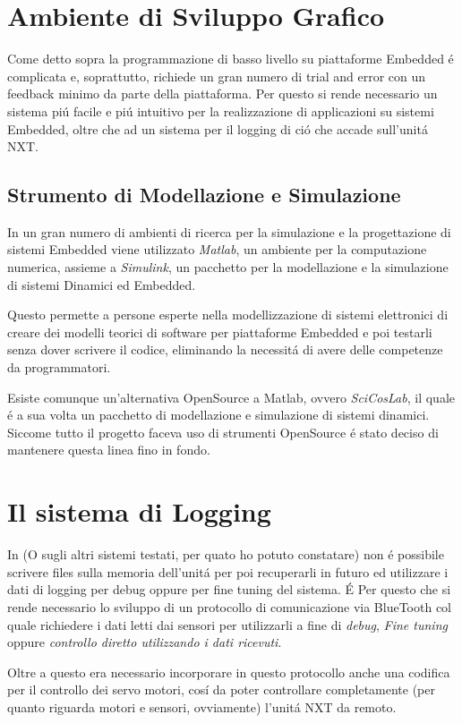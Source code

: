 \section{Ambiente di Sviluppo Grafico}
Come detto sopra la programmazione di basso livello su piattaforme
Embedded \'e complicata e, soprattutto, richiede un gran numero di trial
and error con un feedback minimo da parte della piattaforma. Per questo si
rende necessario un sistema pi\'u facile e pi\'u intuitivo per la
realizzazione di applicazioni su sistemi Embedded, oltre che ad un sistema
per il logging di ci\'o che accade sull'unit\'a NXT.

\subsection{Strumento di Modellazione e Simulazione}
In un gran numero di ambienti di ricerca per la simulazione e la
progettazione di sistemi Embedded viene utilizzato
\emph{Matlab}, un ambiente per la computazione numerica, assieme a \emph
{Simulink}, un pacchetto per la modellazione e la simulazione di sistemi
Dinamici ed Embedded.

Questo permette a persone esperte nella
modellizzazione di sistemi elettronici di creare dei modelli teorici di
software per piattaforme Embedded e poi testarli senza dover scrivere il
codice, eliminando la necessit\'a di avere delle competenze da
programmatori.

Esiste comunque un'alternativa OpenSource a Matlab, ovvero \emph{SciCosLab},
il quale \'e a sua volta un pacchetto di modellazione e simulazione di
sistemi dinamici. Siccome tutto il progetto faceva uso
di strumenti OpenSource \'e stato deciso di mantenere questa linea fino in
fondo.

\section{Il sistema di Logging}
In \nxtOSEK{} (O sugli altri sistemi testati, per quato ho potuto
constatare) non \'e possibile scrivere files sulla memoria dell'unit\'a per
poi recuperarli in futuro ed utilizzare i dati di logging per debug oppure
per fine tuning del sistema. \'E Per questo che si rende necessario lo
sviluppo di un protocollo di comunicazione via BlueTooth col quale
richiedere i dati letti dai sensori per utilizzarli a fine di \emph{debug},
\emph{Fine tuning} oppure \emph{controllo diretto utilizzando i dati
ricevuti}.

Oltre a questo era necessario incorporare in questo
protocollo anche una codifica per il controllo dei servo motori, cos\'i da
poter controllare completamente (per quanto riguarda motori e sensori,
ovviamente) l'unit\'a NXT da remoto.

